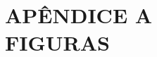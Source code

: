 \clearpage
\vspace*{\fill}
\section*{\centering APÊNDICE A \\ FIGURAS}
\vspace*{\fill}
\clearpage
\newpage



\newpage

\newpage

